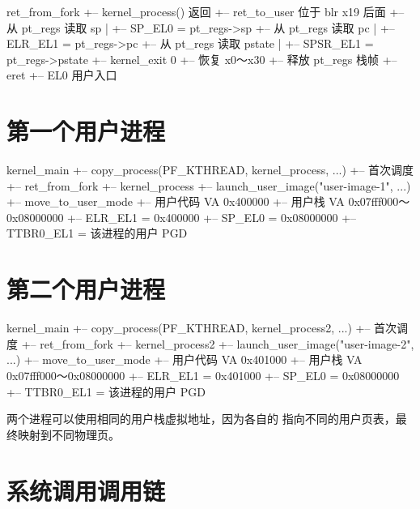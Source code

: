 \begin{txtcode}[basicstyle=\ttfamily\scriptsize]
ret_from_fork
+-- kernel_process() 返回
    +-- ret_to_user                         位于 blr x19 后面
        +-- 从 pt_regs 读取 sp
        |   +-- SP_EL0 = pt_regs->sp
        +-- 从 pt_regs 读取 pc
        |   +-- ELR_EL1 = pt_regs->pc
        +-- 从 pt_regs 读取 pstate
        |   +-- SPSR_EL1 = pt_regs->pstate
        +-- kernel_exit 0
            +-- 恢复 x0～x30
            +-- 释放 pt_regs 栈帧
            +-- eret
                +-- EL0 用户入口
\end{txtcode}

\section{第一个用户进程}

\begin{txtcode}
kernel_main
+-- copy_process(PF_KTHREAD, kernel_process, ...)
    +-- 首次调度
        +-- ret_from_fork
            +-- kernel_process
                +-- launch_user_image("user-image-1", ...)
                    +-- move_to_user_mode
                        +-- 用户代码 VA 0x400000
                        +-- 用户栈 VA 0x07fff000～0x08000000
                        +-- ELR_EL1 = 0x400000
                        +-- SP_EL0 = 0x08000000
                        +-- TTBR0_EL1 = 该进程的用户 PGD
\end{txtcode}

\section{第二个用户进程}

\begin{txtcode}
kernel_main
+-- copy_process(PF_KTHREAD, kernel_process2, ...)
    +-- 首次调度
        +-- ret_from_fork
            +-- kernel_process2
                +-- launch_user_image("user-image-2", ...)
                    +-- move_to_user_mode
                        +-- 用户代码 VA 0x401000
                        +-- 用户栈 VA 0x07fff000～0x08000000
                        +-- ELR_EL1 = 0x401000
                        +-- SP_EL0 = 0x08000000
                        +-- TTBR0_EL1 = 该进程的用户 PGD
\end{txtcode}

两个进程可以使用相同的用户栈虚拟地址，因为各自的  指向不同的用户页表，最终映射到不同物理页。

\section{系统调用调用链}


